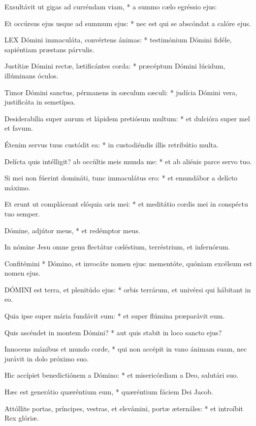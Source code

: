 Exsultávit ut gigas ad curréndam viam, * a summo cælo egréssio ejus:

Et occúrsus ejus usque ad summum ejus: * nec est qui se abscóndat a calóre ejus.


\lettrine[lines=2]{L}{EX} Dómini immaculáta, convértens ánimas: * testimónium Dómini fidéle, sapiéntiam præstans párvulis.

Justítiæ Dómini rectæ, lætificántes corda: * præcéptum Dómini lúcidum, illúminans óculos.

Timor Dómini sanctus, pérmanens in sæculum sæculi: * judícia Dómini vera, justificáta in semetípsa.

Desiderabília super aurum et lápidem pretiósum multum: * et dulcióra super mel et favum.

Étenim servus tuus custódit ea: * in custodiéndis illis retribútio multa.

Delícta quis intélligit? ab occúltis meis munda me: * et ab aliénis parce servo tuo.

Si mei non fúerint domináti, tunc immaculátus ero: * et emundábor a delícto máximo.

Et erunt ut compláceant elóquia oris mei: * et meditátio cordis mei in conspéctu tuo semper.

Dómine, adjútor meus, * et redémptor meus.

 In nómine Jesu omne genu flectátur cæléstium, terréstrium, et infernórum.

 Confitémini * Dómino, et invocáte nomen ejus: mementóte, quóniam excélsum est nomen ejus.


\lettrine[lines=2]{D}{ÓMINI} est terra, et plenitúdo ejus: * orbis terrárum, et univérsi qui hábitant in eo.

Quia ipse super mária fundávit eum: * et super flúmina præparávit eum.

Quis ascéndet in montem Dómini? * aut quis stabit in loco sancto ejus?

Innocens mánibus et mundo corde, * qui non accépit in vano ánimam suam, nec jurávit in dolo próximo suo.

Hic accípiet benedictiónem a Dómino: * et misericórdiam a Deo, salutári suo.

Hæc est generátio quæréntium eum, * quæréntium fáciem Dei Jacob.

Attóllite portas, príncipes, vestras, et elevámini, portæ æternáles: * et introíbit Rex glóriæ.

